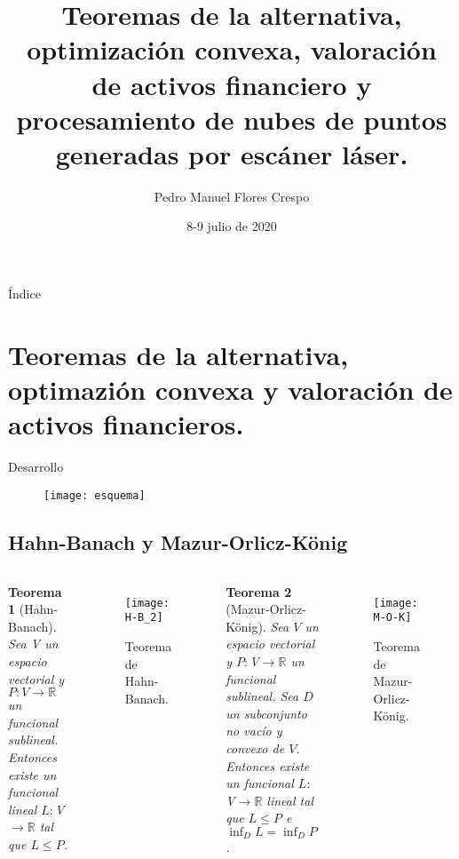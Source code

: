 \documentclass[9pt]{beamer}
\author[]{Pedro Manuel Flores Crespo}
\title[Trabajo Fin de Grado]{Teoremas de la alternativa, optimización convexa, valoración de activos financiero y procesamiento de nubes de puntos generadas por escáner láser.}
\date{8-9 julio de 2020}
\newtheorem{teorema}{Teorema}
\newcommand{\RR}{\mathbb{R}}
\newcommand{\vecSpace}{ $V$ }
\begin{document}
	
	\begin{frame}
		\maketitle
	\end{frame}

	\begin{frame}{Índice}
		\tableofcontents
	\end{frame}

	\section[Teoremas de la alternativa, optimazión convexa y valoración de activos financieros]{Teoremas de la alternativa, optimazión convexa y valoración de activos financieros.}

	\begin{frame}{Desarrollo}
	\begin{figure}[h!]
		\centering
		\texttt{[image: esquema]}
	\end{figure}
	\end{frame}


	\subsection{Hahn-Banach y Mazur-Orlicz-König}
		\begin{frame}[fragile]{}
			\begin{columns}
				\column{0.5\textwidth}
				\begin{teorema}[Hahn-Banach]
					Sea V un espacio vectorial y $P:V \rightarrow \RR$ un funcional sublineal. Entonces existe un funcional lineal $ L:\vecSpace \longrightarrow \RR $ tal que $ L \leq P $.
				\end{teorema}
			\begin{figure}[h!]
				\centering
				\texttt{[image: H-B\_2]}
				\caption{Teorema de Hahn-Banach.}
			\end{figure}
				\column{0.5\textwidth}
				\begin{teorema}[Mazur-Orlicz-König]
						Sea\vecSpace un espacio vectorial y $P:\vecSpace \rightarrow \RR$ un funcional sublineal.  Sea $ D $ un subconjunto no vacío y convexo de $ V $. Entonces existe un funcional $ L: \vecSpace \longrightarrow \RR $ lineal tal que $ L \leq P $ e $ \inf_D L = \inf_D P $.
				\end{teorema}
			\begin{figure}[h!]
				\centering
				\texttt{[image: M-O-K]}
				\caption{Teorema de Mazur-Orlicz-König.}
			\end{figure} 
			\end{columns}
		\end{frame}
\end{document}
